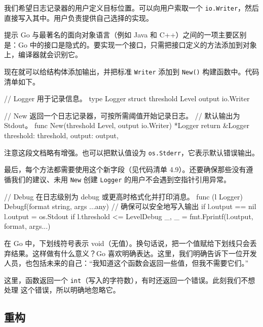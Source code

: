 我们希望日志记录器的用户定义目标位置。可以向用户索取一个 \texttt{io.Writer}，然后直接写入其中。用户负责提供自己选择的实现。

\begin{tipbox}{提示}
Go 与最著名的面向对象语言（例如 Java 和 C++）之间的一项主要区别是：Go 中的接口是隐式的。要实现一个接口，只需把接口定义的方法添加到对象上，编译器就会识别它。
\end{tipbox}

现在就可以给结构体添加输出，并把标准 \texttt{Writer} 添加到 \texttt{New()} 构建函数中。代码清单如下。

\begin{gocode}[title={代码清单 4.8 logger.go：给结构体添加输出字段}]
// Logger 用于记录信息。
type Logger struct {
    threshold Level
    output    io.Writer
}

// New 返回一个日志记录器，可按所需阈值开始记录日志。
// 默认输出为 Stdout。
func New(threshold Level, output io.Writer) *Logger {
    return &Logger{
        threshold: threshold,
        output:    output,
    }
}
\end{gocode}

注意这段文档略有增强。也可以把默认值设为 \texttt{os.Stderr}，它表示默认错误输出。

最后，每个方法都需要使用这个新字段（见代码清单 4.9）。还要确保那些没有遵循我们的建议、未用 \texttt{New} 创建 \texttt{Logger} 的用户不会遇到空指针引用异常。

\begin{gocode}[title={代码清单 4.9 logger.go：给结构体添加输出字段}]
// Debug 在日志级别为 debug 或更高时格式化并打印消息。
func (l Logger) Debugf(format string, args ...any) {
    // 确保可以安全地写入输出
    if l.output == nil {
        l.output = os.Stdout
    }
    if l.threshold <= LevelDebug {
        _, _ = fmt.Fprintf(l.output, format, args...)
    }
}
\end{gocode}

在 Go 中，下划线符号表示 void（无值）。换句话说，把一个值赋给下划线只会丢弃结果。这样做有什么意义？Go 喜欢明确表达。这里，我们明确告诉下一位开发人员，也包括未来的自己：“我知道这个函数会返回一些值，但我不需要它们。”

这里，函数返回一个 \texttt{int}（写入的字符数），有时还返回一个错误。此刻我们不想处理
这个错误，所以明确地忽略它。

\subsection{重构}

